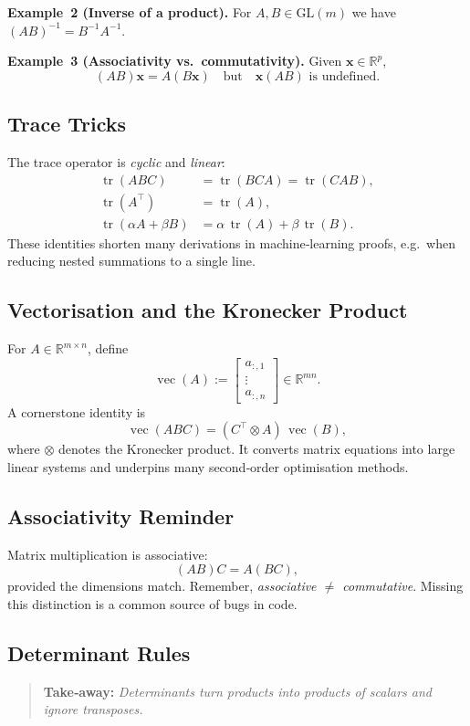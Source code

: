 \medskip
\noindent\textbf{Example 2 (Inverse of a product).} For $A,B\in\mathrm{GL}(m)$ we have $(AB)^{-1}=B^{-1}A^{-1}$. 

\medskip
\noindent\textbf{Example 3 (Associativity vs.~commutativity).} Given $\mathbf x\in\mathbb R^{p}$,
$$(AB)\mathbf x=A(B\mathbf x)\quad\text{but}\quad\mathbf x(AB)\text{ is undefined.}$$

\subsection{Trace Tricks}
The trace operator is \emph{cyclic} and \emph{linear}:
\begin{align}
\operatorname{tr}(ABC) &= \operatorname{tr}(BCA) = \operatorname{tr}(CAB),\\
\operatorname{tr}(A^\top) &= \operatorname{tr}(A),\\
\operatorname{tr}(\alpha A + \beta B) &= \alpha\,\operatorname{tr}(A) + \beta\,\operatorname{tr}(B).
\end{align}
These identities shorten many derivations in machine‑learning proofs, e.g.~when reducing nested summations to a single line.

\subsection{Vectorisation and the Kronecker Product}
For $A\in\mathbb R^{m\times n}$, define
\[
\operatorname{vec}(A) := \begin{bmatrix} a_{:,1} \\ \vdots \\ a_{:,n} \end{bmatrix} \in \mathbb R^{mn}.
\]
A cornerstone identity is
\[
\operatorname{vec}(ABC) = (C^\top \otimes A)\,\operatorname{vec}(B),
\]
where $\otimes$ denotes the Kronecker product. It converts matrix equations into large linear systems and underpins many second‑order optimisation methods.

\subsection{Associativity Reminder}
Matrix multiplication is associative:
\[
(AB)C = A(BC),
\]
provided the dimensions match. Remember, \emph{associative $\neq$ commutative}. Missing this distinction is a common source of bugs in code.

\subsection{Determinant Rules}
\begin{quote}
\textbf{Take‑away:} \emph{Determinants turn products into products of scalars and ignore transposes.}
\end{quote}

